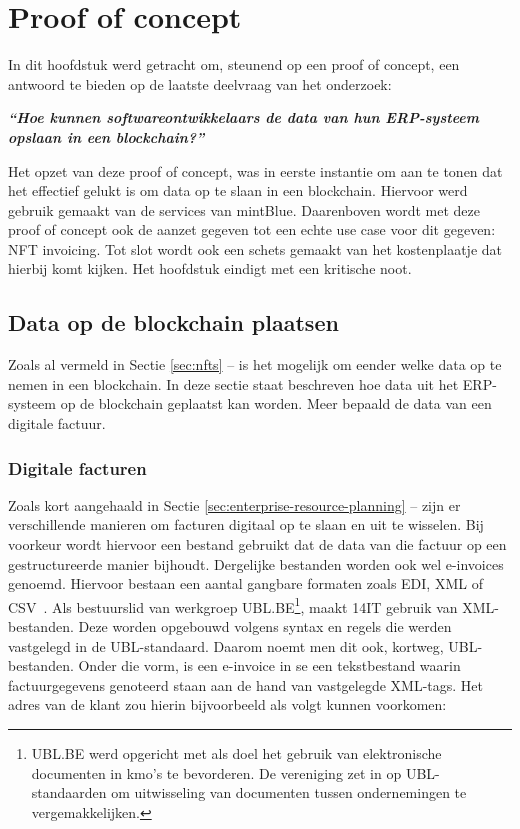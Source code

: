 \chapter{Proof of concept}
\label{ch:proof-of-concept}



In dit hoofdstuk werd getracht om, steunend op een proof of concept, een antwoord te bieden op de laatste deelvraag van het onderzoek:

\begin{center}
	\textit{\textbf{``Hoe kunnen softwareontwikkelaars de data van hun ERP-systeem opslaan in een blockchain?''}}
\end{center}

Het opzet van deze proof of concept, was in eerste instantie om aan te tonen dat het effectief gelukt is om data op te slaan in een blockchain. Hiervoor werd gebruik gemaakt van de services van mintBlue. Daarenboven wordt met deze proof of concept ook de aanzet gegeven tot een echte use case voor dit gegeven: NFT invoicing. Tot slot wordt ook een schets gemaakt van het kostenplaatje dat hierbij komt kijken. Het hoofdstuk eindigt met een kritische noot.


\section{Data op de blockchain plaatsen}
\label{sec:data-op-de-blockchain-plaatsen}

Zoals al vermeld in Sectie \ref{sec:nfts} --  is het mogelijk om eender welke data op te nemen in een blockchain. In deze sectie staat beschreven hoe data uit het ERP-systeem op de blockchain geplaatst kan worden. Meer bepaald de data van een digitale factuur.

\subsection{Digitale facturen}
\label{sub:digitale-facturen}

Zoals kort aangehaald in Sectie \ref{sec:enterprise-resource-planning} --  zijn er verschillende manieren om facturen digitaal op te slaan en uit te wisselen.
Bij voorkeur wordt hiervoor een bestand gebruikt dat de data van die factuur op een gestructureerde manier bijhoudt. Dergelijke bestanden worden ook wel e-invoices genoemd. Hiervoor bestaan een aantal gangbare formaten zoals EDI, XML of CSV~\autocite{Damsgaard2000}. Als bestuurslid van werkgroep UBL.BE\footnote{UBL.BE werd opgericht met als doel het gebruik van elektronische documenten in kmo's te bevorderen. De vereniging zet in op UBL-standaarden om uitwisseling van documenten tussen ondernemingen te vergemakkelijken.}, maakt 14IT gebruik van XML-bestanden. Deze worden opgebouwd volgens syntax en regels die werden vastgelegd in de UBL-standaard. Daarom noemt men dit ook, kortweg, UBL-bestanden. Onder die vorm, is een e-invoice in se een tekstbestand waarin factuurgegevens genoteerd staan aan de hand van vastgelegde XML-tags. Het adres van de klant zou hierin bijvoorbeeld als volgt kunnen voorkomen:


